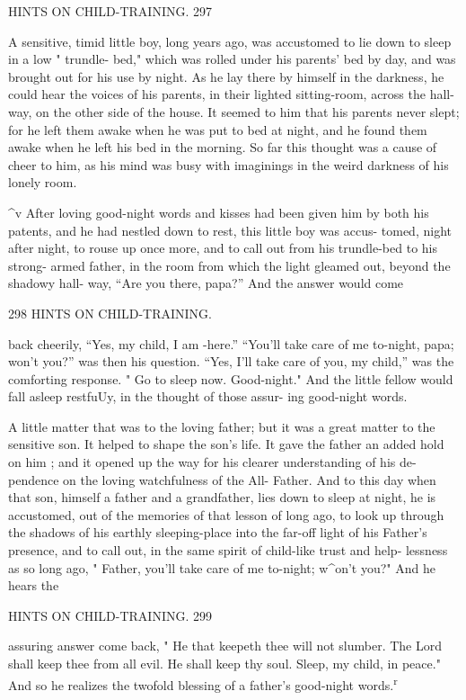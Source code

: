\documentclass[
]{book}
\begin{document}
HINTS ON CHILD-TRAINING. 297

A sensitive, timid little boy, long years ago, was accustomed to lie down to sleep in a low " trundle- bed," which was rolled under his parents' bed by day, and was brought out for his use by night. As he lay there by himself in the darkness, he could hear the voices of his parents, in their lighted sitting-room, across the hall-way, on the other side of the house. It seemed to him that his parents never slept; for he left them awake when he was put to bed at night, and he found them awake when he left his bed in the morning. So far this thought was a cause of cheer to him, as his mind was busy with imaginings in the weird darkness of his lonely room.

\^{}v After loving good-night words and kisses had been given him by both his patents, and he had nestled down to rest, this little boy was accus- tomed, night after night, to rouse up once more, and to call out from his trundle-bed to his strong- armed father, in the room from which the light gleamed out, beyond the shadowy hall- way, ``Are you there, papa?'' And the answer would come

298 HINTS ON CHILD-TRAINING.

back cheerily, ``Yes, my child, I am -here.'' ``You'll take care of me to-night, papa; won't you?'' was then his question. ``Yes, I'll take care of you, my child,'' was the comforting response. " Go to sleep now. Good-night." And the little fellow would fall asleep restfuUy, in the thought of those assur- ing good-night words.

A little matter that was to the loving father; but it was a great matter to the sensitive son. It helped to shape the son's life. It gave the father an added hold on him ; and it opened up the way for his clearer understanding of his de- pendence on the loving watchfulness of the All- Father. And to this day when that son, himself a father and a grandfather, lies down to sleep at night, he is accustomed, out of the memories of that lesson of long ago, to look up through the shadows of his earthly sleeping-place into the far-off light of his Father's presence, and to call out, in the same spirit of child-like trust and help- lessness as so long ago, " Father, you'll take care of me to-night; w\^{}on't you?" And he hears the

HINTS ON CHILD-TRAINING. 299

assuring answer come back, " He that keepeth thee will not slumber. The Lord shall keep thee from all evil. He shall keep thy soul. Sleep, my child, in peace." And so he realizes the twofold blessing of a father's good-night words.\textsuperscript{r}
\end{document}
